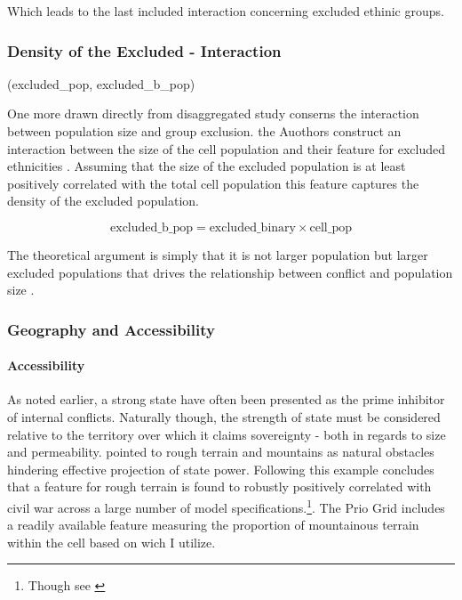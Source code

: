 \documentclass[a4paper]{article}
\begin{document}
Which leads to the last included interaction concerning excluded ethinic groups.\par 

\subsubsection{Density of the Excluded - Interaction} %

(excluded\_pop, excluded\_b\_pop) 

One more drawn directly from \cite{Cederman_Gleditsch_Buhaug_2013} disaggregated study conserns the interaction between population size and group exclusion. the Auothors construct an interaction between the size of the cell population and their feature for excluded ethnicities \citep[73-78]{Cederman_Gleditsch_Buhaug_2013}. Assuming that the size of the excluded population is at least positively correlated with the total cell population this feature captures the density of the excluded population. 

$$ \textrm{excluded\_b\_pop}  = \textrm{excluded\_binary} \times \textrm{cell\_pop}  $$

The theoretical argument is simply that it is not larger population but larger excluded populations that drives the relationship between conflict and population size \citep[69-74]{Cederman_Gleditsch_Buhaug_2013}.

\subsubsection{Geography and Accessibility} %

\paragraph{Accessibility} As noted earlier, a strong state have often been presented as the prime inhibitor of internal conflicts. Naturally though, the strength of state must be considered relative to the territory over which it claims sovereignty - both in regards to size and permeability. \cite{Fearon_Laitin_2003} pointed to rough terrain and mountains as natural obstacles hindering effective projection of state power. Following this example \cite{Hegre_Sambanis_2006} concludes that a feature for rough terrain is found to robustly positively correlated with civil war across a large number of model specifications.\cite[526-529]{Hegre_Sambanis_2006}\footnote{Though see \cite{Goldstone_2010}}. The Prio Grid includes a readily available feature measuring the proportion of mountainous terrain within the cell based on \cite{Blyth_2002} wich I utilize.\par
\end{document}
